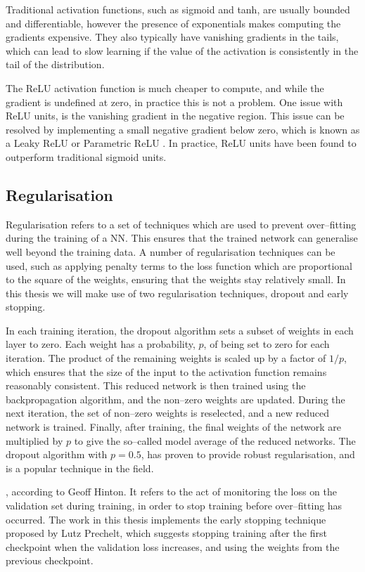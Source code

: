 Traditional activation functions, such as sigmoid and tanh, are usually 
bounded and differentiable, however the presence of exponentials makes 
computing the gradients expensive. They also typically have vanishing 
gradients in the tails, which can lead to slow learning if the value of the 
activation is consistently in the tail of the distribution. 

The ReLU activation function is much cheaper to compute, and while the 
gradient is undefined at zero, in practice this is not a problem. One issue 
with ReLU units, is the vanishing gradient in the negative region. This issue 
can be resolved by implementing a small negative gradient below zero, which is 
known as a Leaky ReLU or Parametric ReLU \cite{He2015}. In practice, ReLU 
units have been found to outperform traditional sigmoid 
units\cite{Maas13rectifiernonlinearities, 10.5555/3104322.3104425}.

\subsection{Regularisation}
Regularisation refers to a set of techniques which are used to prevent
over--fitting during the training of a NN. This ensures that the trained network
can generalise well beyond the training data. A number of regularisation
techniques can be used, such as applying penalty terms to the loss
function which are proportional to the square of the weights, ensuring that 
the weights stay relatively small. In this thesis we will make use of two 
regularisation techniques, dropout\cite{Srivastava2014DropoutAS} and early
stopping\cite{OrrGenevieveB.1998NNTo}.

In each training iteration, the dropout algorithm sets a subset of weights in
each layer to zero. Each weight has a probability, $p$, of being set to zero for
each iteration. The product of the remaining weights is scaled up by a factor 
of $1/p$, which ensures that the size of the input to the activation function
remains reasonably consistent. This reduced network is then trained using the
backpropagation algorithm, and the non--zero weights are updated. During the
next iteration, the set of non--zero weights is reselected, and a new reduced
network is trained. Finally, after training, the final weights of the network
are multiplied by $p$ to give the so--called model average of the reduced
networks. The dropout algorithm with $p=0.5$, has proven to provide robust
regularisation, and is a popular technique in the field\cite{Lecun2015}.

, according to Geoff
Hinton\cite{Hinton2015}. It refers to the act of monitoring the loss on the 
validation set during training, in order to stop training before over--fitting 
has occurred. The work in this thesis implements the early stopping technique 
proposed by Lutz Prechelt\cite{OrrGenevieveB.1998NNTo}, which suggests 
stopping training after the first checkpoint when the validation loss increases,
and using the weights from the previous checkpoint.
